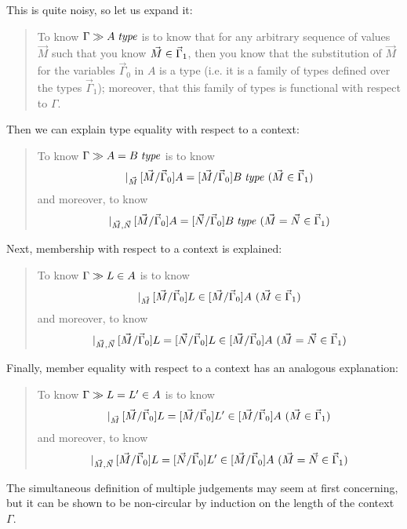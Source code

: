 \documentclass[main.tex]{subfiles}
\begin{document}
This is quite noisy, so let us expand it:

\begin{quote}
  To know $\Gamma\gg A\;\mathit{type}$ is to know that for any
  arbitrary sequence of values $\vec{M}$ such that you know
  $\vec{M}\in\vec\Gamma_1$, then you know that the substitution of
  $\vec{M}$ for the variables $\vec\Gamma_0$ in $A$ is a type (i.e. it
  is a family of types defined over the types $\vec\Gamma_1$); moreover,
  that this family of types is functional with respect to $\Gamma$.
\end{quote}

Then we can explain type equality with respect to a context:

\begin{quote}
  To know $\Gamma\gg A=B\;\mathit{type}$ is to know
  \[\lvert_{\vec{M}}\,[\vec{M}/\vec\Gamma_0]A=[\vec{M}/\vec\Gamma_0]B\;\mathit{type}\ (\vec{M}\in\vec\Gamma_1)\]
  and moreover, to know
  \[\lvert_{\vec{M},\vec{N}}\,[\vec{M}/\vec\Gamma_0]A =
  [\vec{N}/\vec\Gamma_0]B\;\mathit{type}\ (\vec{M}=\vec{N}\in\vec\Gamma_1)\]
\end{quote}

Next, membership with respect to a context is explained:

\begin{quote}
  To know $\Gamma\gg L\in A$ is to know
  \[\lvert_{\vec{M}}\,[\vec{M}/\vec\Gamma_0]L\in[\vec{M}/\vec\Gamma_0]A\ (\vec{M}\in\vec\Gamma_1)\]
  and moreover, to know
  \[\lvert_{\vec{M},\vec{N}}\,[\vec{M}/\vec\Gamma_0]L = [\vec{N}/\vec\Gamma_0]L\in[\vec{M}/\vec\Gamma_0]A\ (\vec{M}=\vec{N}\in\vec\Gamma_1)\]
\end{quote}

Finally, member equality with respect to a context has an analogous explanation:

\begin{quote}
  To know $\Gamma\gg L=L'\in A$ is to know
  \[\lvert_{\vec{M}}\,[\vec{M}/\vec\Gamma_0]L=[\vec{M}/\vec\Gamma_0]L'\in[\vec{M}/\vec\Gamma_0]A\ (\vec{M}\in\vec\Gamma_1)\]
  and moreover, to know
  \[\lvert_{\vec{M},\vec{N}}\,[\vec{M}/\vec\Gamma_0]L = [\vec{N}/\vec\Gamma_0]L'\in[\vec{M}/\vec\Gamma_0]A\ (\vec{M}=\vec{N}\in\vec\Gamma_1)\]
\end{quote}

The simultaneous definition of multiple judgements may seem at first
concerning, but it can be shown to be non-circular by induction on the length
of the context $\Gamma$.
\end{document}
